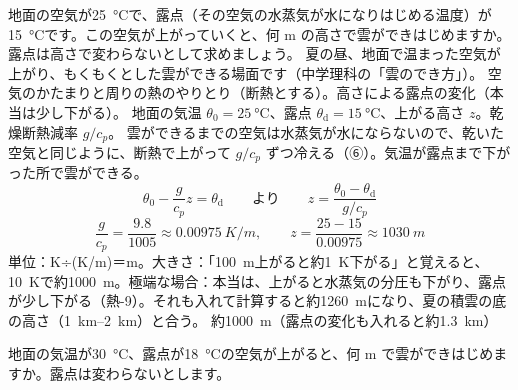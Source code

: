 \begin{phreidai}[雲ができる高さ]
\label{ph:熱-3:ex16}地面の空気が\qty{25}{\celsius}で、露点（その空気の水蒸気が水になりはじめる温度）が\qty{15}{\celsius}です。この空気が上がっていくと、何 m の高さで雲ができはじめますか。露点は高さで変わらないとして求めましょう。
\phbamen
夏の昼、地面で温まった空気が上がり、もくもくとした雲ができる場面です（中学理科の「雲のでき方」）。
\phmushi
空気のかたまりと周りの熱のやりとり（断熱とする）。高さによる露点の変化（本当は少し下がる）。
\phzu
地面の気温 $\theta_0=\qty{25}{\celsius}$、露点 $\theta_{\mathrm d}=\qty{15}{\celsius}$、上がる高さ $z$。乾燥断熱減率 $g/c_p$。
\phriyu
雲ができるまでの空気は水蒸気が水にならないので、乾いた空気と同じように、断熱で上がって $g/c_p$ ずつ冷える（⑥）。気温が露点まで下がった所で雲ができる。
\phtateru
\[ \theta_0-\frac{g}{c_p}z=\theta_{\mathrm d}\qquad\text{より}\qquad z=\frac{\theta_0-\theta_{\mathrm d}}{g/c_p} \]
\phtoku
\[ \frac{g}{c_p}=\frac{9.8}{1005}\approx\qty{0.00975}{K/m},\qquad z=\frac{25-15}{0.00975}\approx\qty{1030}{m} \]
\phtashikame
単位：K÷(K/m)＝m。大きさ：「\qty{100}{m}上がると約\qty{1}{K}下がる」と覚えると、\qty{10}{K}で約\qty{1000}{m}。極端な場合：本当は、上がると水蒸気の分圧も下がり、露点が少し下がる（熱-9）。それも入れて計算すると約\qty{1260}{m}になり、夏の積雲の底の高さ（\qtyrange{1}{2}{km}）と合う。
\kotae 約\qty{1000}{m}（露点の変化も入れると約\qty{1.3}{km}）
\end{phreidai}
\begin{jibun}
地面の気温が\qty{30}{\celsius}、露点が\qty{18}{\celsius}の空気が上がると、何 m で雲ができはじめますか。露点は変わらないとします。
\end{jibun}

